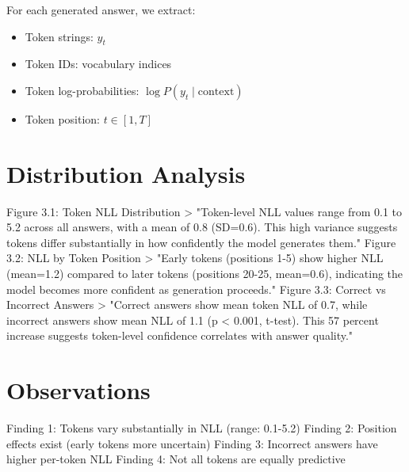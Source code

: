 \documentclass[a4paper,oneside,10pt,ngerman,english]{scrbook}
\begin{document}
For each generated answer, we extract:
\begin{itemize}
\item Token strings: $y_t$
\item Token IDs: vocabulary indices
\item Token log-probabilities: $\log P(y_t\mid\text{context})$
\item Token position: $t \in [1, T]$
\end{itemize}

\section{Distribution Analysis}
Figure 3.1: Token NLL Distribution
> "Token-level NLL values range from 0.1 to 5.2 across all answers, with a mean of 0.8 (SD=0.6). This high variance suggests tokens differ substantially in how confidently the model generates them."
Figure 3.2: NLL by Token Position
> "Early tokens (positions 1-5) show higher NLL (mean=1.2) compared to later tokens (positions 20-25, mean=0.6), indicating the model becomes more confident as generation proceeds."
Figure 3.3: Correct vs Incorrect Answers
> "Correct answers show mean token NLL of 0.7, while incorrect answers show mean NLL of 1.1 (p < 0.001, t-test). This 57 percent increase suggests token-level confidence correlates with answer quality."
\section{Observations}
Finding 1: Tokens vary substantially in NLL (range: 0.1-5.2)
Finding 2: Position effects exist (early tokens more uncertain)
Finding 3: Incorrect answers have higher per-token NLL
Finding 4: Not all tokens are equally predictive
\end{document}
